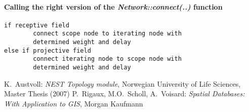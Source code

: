 \documentclass{article}
\begin{document}
\paragraph{Calling the right version of the \emph{Network::connect(..)} function}
\begin{verbatim}
if receptive field
        connect scope node to iterating node with 
        determined weight and delay
else if projective field
        connect iterating node to scope node with 
        determined weight and delay
\end{verbatim}

\begin{thebibliography}{99}
 K.~Austvoll:
\emph{NEST Topology module},
Norwegian University of Life Sciences,
Master Thesis (2007)
 P.~Rigaux, M.O.~Scholl, A.~Voisard:
\emph{Spatial Databases: With Application to GIS},
Morgan Kaufmann
\end{thebibliography}
\end{document}
